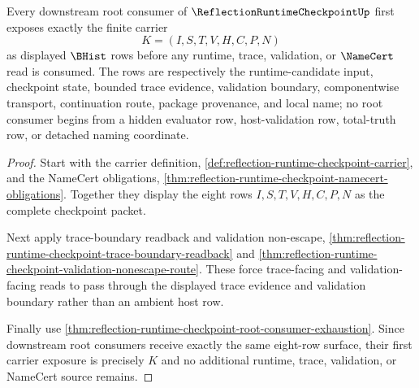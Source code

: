 \begin{theorem}
\label{thm:reflection-runtime-checkpoint-root-carrier-totality}
Every downstream root consumer of $\ReflectionRuntimeCheckpointUp$ first exposes exactly the finite carrier
$$
K=(I,S,T,V,H,C,P,N)
$$
as displayed $\BHist$ rows before any runtime, trace, validation, or $\NameCert$ read is consumed. The rows are respectively the runtime-candidate input, checkpoint state, bounded trace evidence, validation boundary, componentwise transport, continuation route, package provenance, and local name; no root consumer begins from a hidden evaluator row, host-validation row, total-truth row, or detached naming coordinate.
\end{theorem}
\begin{proof}
Start with the carrier definition, \autoref{def:reflection-runtime-checkpoint-carrier}, and the NameCert obligations, \autoref{thm:reflection-runtime-checkpoint-namecert-obligations}. Together they display the eight rows $I,S,T,V,H,C,P,N$ as the complete checkpoint packet.

Next apply trace-boundary readback and validation non-escape, \autoref{thm:reflection-runtime-checkpoint-trace-boundary-readback} and \autoref{thm:reflection-runtime-checkpoint-validation-nonescape-route}. These force trace-facing and validation-facing reads to pass through the displayed trace evidence and validation boundary rather than an ambient host row.

Finally use \autoref{thm:reflection-runtime-checkpoint-root-consumer-exhaustion}. Since downstream root consumers receive exactly the same eight-row surface, their first carrier exposure is precisely $K$ and no additional runtime, trace, validation, or NameCert source remains.
\end{proof}

